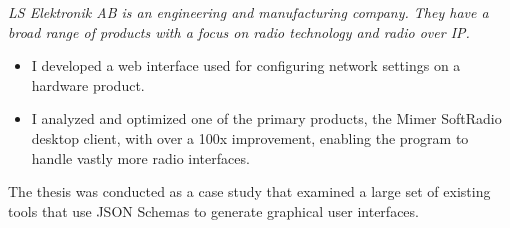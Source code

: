 \documentclass[10pt,a4paper]{altacv}
\begin{document}

\begin{fullwidth}
\makecvheader
\end{fullwidth}




\textit{LS Elektronik AB is an engineering and manufacturing company. They have a broad range of products with a focus on radio technology and radio over IP.}
\begin{itemize}
    \item I developed a web interface used for configuring network settings on a hardware product.
    \item I analyzed and optimized one of the primary products, the Mimer SoftRadio desktop client, with over a 100x improvement, enabling the program to handle vastly more radio interfaces.
\end{itemize}

\divider

The thesis was conducted as a case study that examined a large set of existing tools that use JSON Schemas to generate graphical user interfaces.

\end{document}
